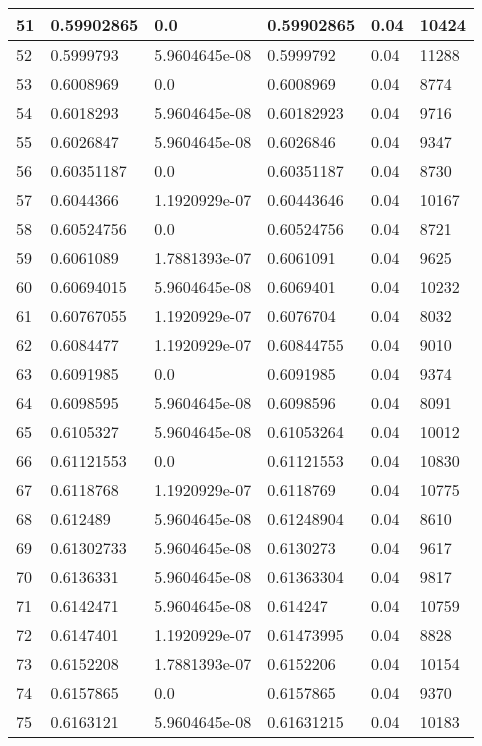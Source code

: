 \begin{longtable}{|l|l|l|l|l|l|}
51 & 0.59902865 & 0.0 & 0.59902865 & 0.04 & 10424 \\ \hline 
52 & 0.5999793 & 5.9604645e-08 & 0.5999792 & 0.04 & 11288 \\ \hline 
53 & 0.6008969 & 0.0 & 0.6008969 & 0.04 & 8774 \\ \hline 
54 & 0.6018293 & 5.9604645e-08 & 0.60182923 & 0.04 & 9716 \\ \hline 
55 & 0.6026847 & 5.9604645e-08 & 0.6026846 & 0.04 & 9347 \\ \hline 
56 & 0.60351187 & 0.0 & 0.60351187 & 0.04 & 8730 \\ \hline 
57 & 0.6044366 & 1.1920929e-07 & 0.60443646 & 0.04 & 10167 \\ \hline 
58 & 0.60524756 & 0.0 & 0.60524756 & 0.04 & 8721 \\ \hline 
59 & 0.6061089 & 1.7881393e-07 & 0.6061091 & 0.04 & 9625 \\ \hline 
60 & 0.60694015 & 5.9604645e-08 & 0.6069401 & 0.04 & 10232 \\ \hline 
61 & 0.60767055 & 1.1920929e-07 & 0.6076704 & 0.04 & 8032 \\ \hline 
62 & 0.6084477 & 1.1920929e-07 & 0.60844755 & 0.04 & 9010 \\ \hline 
63 & 0.6091985 & 0.0 & 0.6091985 & 0.04 & 9374 \\ \hline 
64 & 0.6098595 & 5.9604645e-08 & 0.6098596 & 0.04 & 8091 \\ \hline 
65 & 0.6105327 & 5.9604645e-08 & 0.61053264 & 0.04 & 10012 \\ \hline 
66 & 0.61121553 & 0.0 & 0.61121553 & 0.04 & 10830 \\ \hline 
67 & 0.6118768 & 1.1920929e-07 & 0.6118769 & 0.04 & 10775 \\ \hline 
68 & 0.612489 & 5.9604645e-08 & 0.61248904 & 0.04 & 8610 \\ \hline 
69 & 0.61302733 & 5.9604645e-08 & 0.6130273 & 0.04 & 9617 \\ \hline 
70 & 0.6136331 & 5.9604645e-08 & 0.61363304 & 0.04 & 9817 \\ \hline 
71 & 0.6142471 & 5.9604645e-08 & 0.614247 & 0.04 & 10759 \\ \hline 
72 & 0.6147401 & 1.1920929e-07 & 0.61473995 & 0.04 & 8828 \\ \hline 
73 & 0.6152208 & 1.7881393e-07 & 0.6152206 & 0.04 & 10154 \\ \hline 
74 & 0.6157865 & 0.0 & 0.6157865 & 0.04 & 9370 \\ \hline 
75 & 0.6163121 & 5.9604645e-08 & 0.61631215 & 0.04 & 10183 \\ \hline 
\end{longtable}